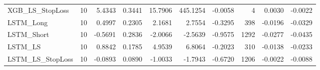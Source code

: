 \begin{tabular}{llrrrrrrrr}
\cline{1-10}
XGB\_LS\_StopLoss & 10 & 5.4343 & 0.3441 & 15.7906 & 445.1254 & -0.0058 & 4 & 0.0030 & -0.0022 \\
\cline{1-10}
LSTM\_Long & 10 & 0.4997 & 0.2305 & 2.1681 & 2.7554 & -0.3295 & 398 & -0.0196 & -0.0329 \\
\cline{1-10}
LSTM\_Short & 10 & -0.5691 & 0.2836 & -2.0066 & -2.5639 & -0.9575 & 1292 & -0.0277 & -0.0435 \\
\cline{1-10}
LSTM\_LS & 10 & 0.8842 & 0.1785 & 4.9539 & 6.8064 & -0.2023 & 310 & -0.0138 & -0.0233 \\
\cline{1-10}
LSTM\_LS\_StopLoss & 10 & -0.0893 & 0.0890 & -1.0033 & -1.7943 & -0.6720 & 1206 & -0.0022 & -0.0088 \\
\cline{1-10}
\bottomrule
\end{tabular}
